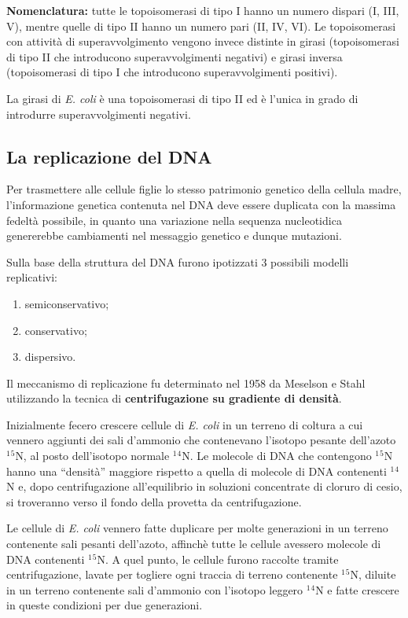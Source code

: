 \documentclass[]{article}
\begin{document}
\textbf{Nomenclatura:} tutte le topoisomerasi di tipo I hanno un numero
dispari (I, III, V), mentre quelle di tipo II hanno un numero pari (II,
IV, VI). Le topoisomerasi con attività di superavvolgimento vengono
invece distinte in girasi (topoisomerasi di tipo II che introducono
superavvolgimenti negativi) e girasi inversa (topoisomerasi di tipo I
che introducono superavvolgimenti positivi).

La girasi di \emph{E. coli} è una topoisomerasi di tipo II ed è l'unica
in grado di introdurre superavvolgimenti negativi.

\subsection{La replicazione del DNA}\label{la-replicazione-del-dna}

Per trasmettere alle cellule figlie lo stesso patrimonio genetico della
cellula madre, l'informazione genetica contenuta nel DNA deve essere
duplicata con la massima fedeltà possibile, in quanto una variazione
nella sequenza nucleotidica genererebbe cambiamenti nel messaggio
genetico e dunque mutazioni.

Sulla base della struttura del DNA furono ipotizzati 3 possibili modelli
replicativi:

\begin{enumerate}
\def\labelenumi{\arabic{enumi}.}
\itemsep1pt\parskip0pt
\item
  semiconservativo;
\item
  conservativo;
\item
  dispersivo.
\end{enumerate}

Il meccanismo di replicazione fu determinato nel 1958 da Meselson e
Stahl utilizzando la tecnica di \textbf{centrifugazione su gradiente di
densità}.

Inizialmente fecero crescere cellule di \emph{E. coli} in un terreno di
coltura a cui vennero aggiunti dei sali d'ammonio che contenevano
l'isotopo pesante dell'azoto $^1$$^5$N, al posto dell'isotopo normale
$^1$$^4$N. Le molecole di DNA che contengono $^1$$^5$N hanno una
``densità'' maggiore rispetto a quella di molecole di DNA contenenti
$^1$$^4$N e, dopo centrifugazione all'equilibrio in soluzioni
concentrate di cloruro di cesio, si troveranno verso il fondo della
provetta da centrifugazione.

Le cellule di \emph{E. coli} vennero fatte duplicare per molte
generazioni in un terreno contenente sali pesanti dell'azoto, affinchè
tutte le cellule avessero molecole di DNA contenenti $^1$$^5$N. A quel
punto, le cellule furono raccolte tramite centrifugazione, lavate per
togliere ogni traccia di terreno contenente $^1$$^5$N, diluite in un
terreno contenente sali d'ammonio con l'isotopo leggero $^1$$^4$N e
fatte crescere in queste condizioni per due generazioni.
\end{document}
